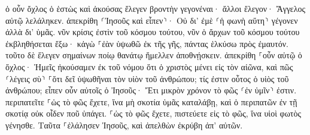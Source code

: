 \documentclass{openreader}
\begin{document}
ὁ οὖν ὄχλος ὁ ἑστὼς καὶ ἀκούσας ἔλεγεν βροντὴν γεγονέναι· ἄλλοι ἔλεγον· Ἄγγελος αὐτῷ λελάληκεν. 
ἀπεκρίθη ⸂Ἰησοῦς καὶ εἶπεν⸃· Οὐ δι’ ἐμὲ ⸂ἡ φωνὴ αὕτη⸃ γέγονεν ἀλλὰ δι’ ὑμᾶς. 
νῦν κρίσις ἐστὶν τοῦ κόσμου τούτου, νῦν ὁ ἄρχων τοῦ κόσμου τούτου ἐκβληθήσεται ἔξω· 
κἀγὼ ⸀ἐὰν ὑψωθῶ ἐκ τῆς γῆς, πάντας ἑλκύσω πρὸς ἐμαυτόν. 
τοῦτο δὲ ἔλεγεν σημαίνων ποίῳ θανάτῳ ἤμελλεν ἀποθνῄσκειν. 
ἀπεκρίθη ⸀οὖν αὐτῷ ὁ ὄχλος· Ἡμεῖς ἠκούσαμεν ἐκ τοῦ νόμου ὅτι ὁ χριστὸς μένει εἰς τὸν αἰῶνα, καὶ πῶς ⸂λέγεις σὺ⸃ ⸀ὅτι δεῖ ὑψωθῆναι τὸν υἱὸν τοῦ ἀνθρώπου; τίς ἐστιν οὗτος ὁ υἱὸς τοῦ ἀνθρώπου; 
εἶπεν οὖν αὐτοῖς ὁ Ἰησοῦς· Ἔτι μικρὸν χρόνον τὸ φῶς ⸂ἐν ὑμῖν⸃ ἐστιν. περιπατεῖτε ⸀ὡς τὸ φῶς ἔχετε, ἵνα μὴ σκοτία ὑμᾶς καταλάβῃ, καὶ ὁ περιπατῶν ἐν τῇ σκοτίᾳ οὐκ οἶδεν ποῦ ὑπάγει. 
⸀ὡς τὸ φῶς ἔχετε, πιστεύετε εἰς τὸ φῶς, ἵνα υἱοὶ φωτὸς γένησθε. Ταῦτα ⸀ἐλάλησεν Ἰησοῦς, καὶ ἀπελθὼν ἐκρύβη ἀπ’ αὐτῶν. 
\end{document}
